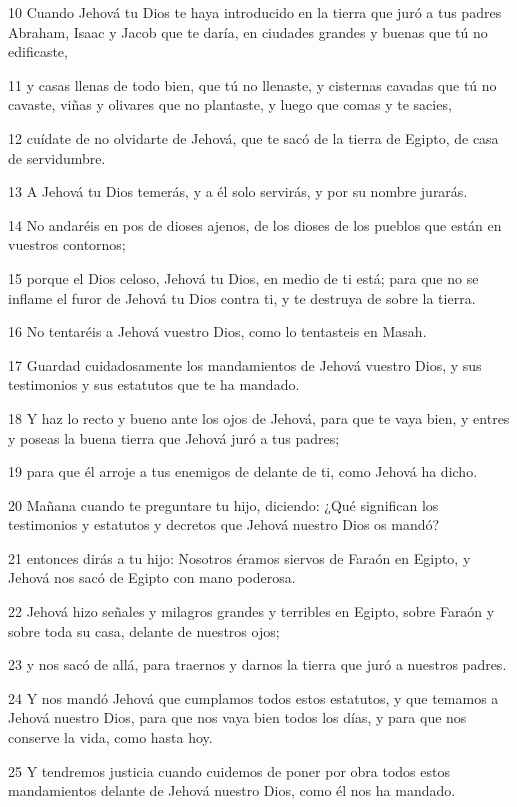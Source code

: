 \par 10 Cuando Jehová tu Dios te haya introducido en la tierra que juró a tus padres Abraham, Isaac y Jacob que te daría, en ciudades grandes y buenas que tú no edificaste,
\par 11 y casas llenas de todo bien, que tú no llenaste, y cisternas cavadas que tú no cavaste, viñas y olivares que no plantaste, y luego que comas y te sacies,
\par 12 cuídate de no olvidarte de Jehová, que te sacó de la tierra de Egipto, de casa de servidumbre.
\par 13 A Jehová tu Dios temerás, y a él solo servirás, y por su nombre jurarás.
\par 14 No andaréis en pos de dioses ajenos, de los dioses de los pueblos que están en vuestros contornos;
\par 15 porque el Dios celoso, Jehová tu Dios, en medio de ti está; para que no se inflame el furor de Jehová tu Dios contra ti, y te destruya de sobre la tierra.
\par 16 No tentaréis a Jehová vuestro Dios, como lo tentasteis en Masah.
\par 17 Guardad cuidadosamente los mandamientos de Jehová vuestro Dios, y sus testimonios y sus estatutos que te ha mandado.
\par 18 Y haz lo recto y bueno ante los ojos de Jehová, para que te vaya bien, y entres y poseas la buena tierra que Jehová juró a tus padres;
\par 19 para que él arroje a tus enemigos de delante de ti, como Jehová ha dicho.
\par 20 Mañana cuando te preguntare tu hijo, diciendo: ¿Qué significan los testimonios y estatutos y decretos que Jehová nuestro Dios os mandó?
\par 21 entonces dirás a tu hijo: Nosotros éramos siervos de Faraón en Egipto, y Jehová nos sacó de Egipto con mano poderosa.
\par 22 Jehová hizo señales y milagros grandes y terribles en Egipto, sobre Faraón y sobre toda su casa, delante de nuestros ojos;
\par 23 y nos sacó de allá, para traernos y darnos la tierra que juró a nuestros padres.
\par 24 Y nos mandó Jehová que cumplamos todos estos estatutos, y que temamos a Jehová nuestro Dios, para que nos vaya bien todos los días, y para que nos conserve la vida, como hasta hoy.
\par 25 Y tendremos justicia cuando cuidemos de poner por obra todos estos mandamientos delante de Jehová nuestro Dios, como él nos ha mandado.

